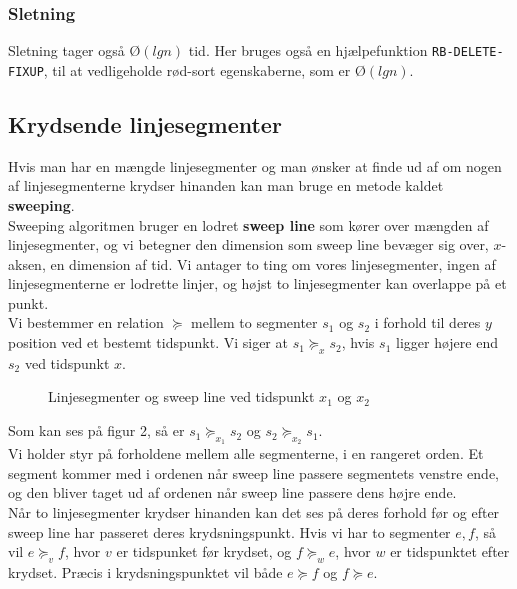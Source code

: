 \subsubsection{Sletning}
Sletning tager også $Ø(lgn)$ tid. Her bruges også en hjælpefunktion \texttt{RB-DELETE-FIXUP}, til at vedligeholde rød-sort egenskaberne, som er $Ø(lgn)$.

\subsection{Krydsende linjesegmenter}
Hvis man har en mængde linjesegmenter og man ønsker at finde ud af om nogen af linjesegmenterne krydser hinanden kan man bruge en metode kaldet \textbf{sweeping}.\\
Sweeping algoritmen bruger en lodret \textbf{sweep line} som kører over mængden af linjesegmenter, og vi betegner den dimension som sweep line bevæger sig over, $x$-aksen, en dimension af tid. Vi antager to ting om vores linjesegmenter, ingen af linjesegmenterne er lodrette linjer, og højst to linjesegmenter kan overlappe på et punkt.\\

Vi bestemmer en relation $\succeq$ mellem to segmenter $s_1$ og $s_2$ i forhold til deres $y$ position ved et bestemt tidspunkt. Vi siger at $s_1 \succeq_x s_2$, hvis $s_1$ ligger højere end $s_2$ ved tidspunkt $x$.
\begin{figure}[H]
  \centering
  \caption{Linjesegmenter og sweep line ved tidspunkt $x_1$ og $x_2$}
\end{figure}

Som kan ses på figur 2, så er $s_1 \succeq_{x_1} s_2$ og $s_2 \succeq_{x_2} s_1$.\\
Vi holder styr på forholdene mellem alle segmenterne, i en rangeret orden. Et segment kommer med i ordenen når sweep line passere segmentets venstre ende, og den bliver taget ud af ordenen når sweep line passere dens højre ende.\\

Når to linjesegmenter krydser hinanden kan det ses på deres forhold før og efter sweep line har passeret deres krydsningspunkt. Hvis vi har to segmenter $e, f$, så vil $e \succeq_v f$, hvor $v$ er tidspunket før krydset, og $f \succeq_w e$, hvor $w$ er tidspunktet efter krydset. Præcis i krydsningspunktet vil både $e \succeq f$ og $f \succeq e$.\\

